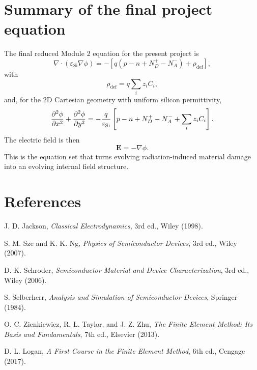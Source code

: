 \documentclass[11pt]{article}
\newcommand{\Evec}{\mathbf{E}}
\begin{document}
\section{Summary of the final project equation}

The final reduced Module 2 equation for the present project is
\begin{equation}
\nabla \cdot (\varepsilon_{\mathrm{Si}} \nabla \phi)
= -\left[q(p - n + N_D^+ - N_A^-) + \rho_{\mathrm{def}}\right],
\end{equation}
with
\begin{equation}
\rho_{\mathrm{def}} = q \sum_i z_i C_i,
\end{equation}
and, for the 2D Cartesian geometry with uniform silicon permittivity,
\begin{equation}
\pdv[2]{\phi}{x} + \pdv[2]{\phi}{y}
= -\frac{q}{\varepsilon_{\mathrm{Si}}}
\left[p - n + N_D^+ - N_A^- + \sum_i z_i C_i\right].
\end{equation}
The electric field is then
\begin{equation}
\Evec = -\nabla \phi.
\end{equation}
This is the equation set that turns evolving radiation-induced material damage into an evolving internal field structure.

\section{References}
\begin{sloppypar}
\begin{enumerate}[label={[\arabic*]}]
\item J. D. Jackson, \emph{Classical Electrodynamics}, 3rd ed., Wiley (1998).
\item S. M. Sze and K. K. Ng, \emph{Physics of Semiconductor Devices}, 3rd ed., Wiley (2007).
\item D. K. Schroder, \emph{Semiconductor Material and Device Characterization}, 3rd ed., Wiley (2006).
\item S. Selberherr, \emph{Analysis and Simulation of Semiconductor Devices}, Springer (1984).
\item O. C. Zienkiewicz, R. L. Taylor, and J. Z. Zhu, \emph{The Finite Element Method: Its Basis and Fundamentals}, 7th ed., Elsevier (2013).
\item D. L. Logan, \emph{A First Course in the Finite Element Method}, 6th ed., Cengage (2017).
\end{enumerate}
\end{sloppypar}
\end{document}
